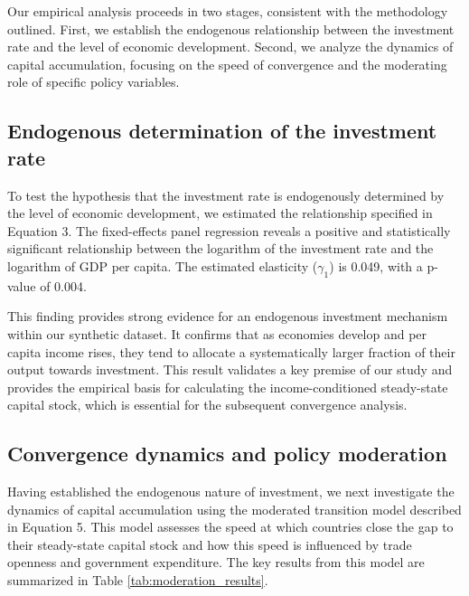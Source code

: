 \documentclass[]{article}
\begin{document}
Our empirical analysis proceeds in two stages, consistent with the methodology outlined. First, we establish the endogenous relationship between the investment rate and the level of economic development. Second, we analyze the dynamics of capital accumulation, focusing on the speed of convergence and the moderating role of specific policy variables.

\subsection{Endogenous determination of the investment rate}
To test the hypothesis that the investment rate is endogenously determined by the level of economic development, we estimated the relationship specified in Equation 3. The fixed-effects panel regression reveals a positive and statistically significant relationship between the logarithm of the investment rate and the logarithm of GDP per capita. The estimated elasticity ($\gamma_1$) is 0.049, with a p-value of 0.004.

This finding provides strong evidence for an endogenous investment mechanism within our synthetic dataset. It confirms that as economies develop and per capita income rises, they tend to allocate a systematically larger fraction of their output towards investment. This result validates a key premise of our study and provides the empirical basis for calculating the income-conditioned steady-state capital stock, which is essential for the subsequent convergence analysis.

\subsection{Convergence dynamics and policy moderation}
Having established the endogenous nature of investment, we next investigate the dynamics of capital accumulation using the moderated transition model described in Equation 5. This model assesses the speed at which countries close the gap to their steady-state capital stock and how this speed is influenced by trade openness and government expenditure. The key results from this model are summarized in Table \ref{tab:moderation_results}.
\end{document}

